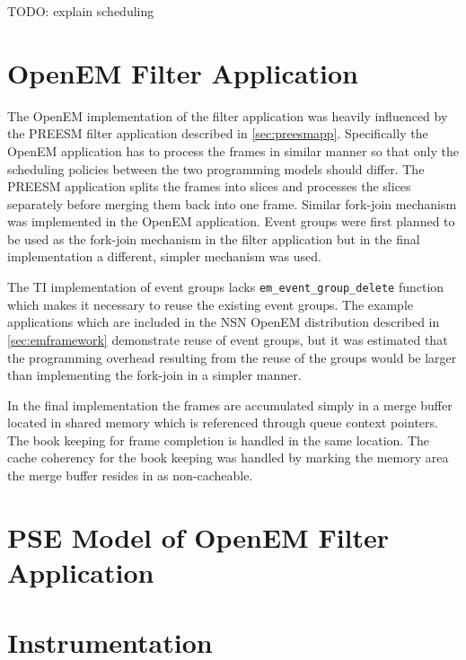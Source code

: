 TODO: explain scheduling

\section{OpenEM Filter Application}
The OpenEM implementation of the filter application was heavily influenced by
the PREESM filter application described in \ref{sec:preesmapp}. Specifically the
OpenEM application has to process the frames in similar manner so that only the
scheduling policies between the two programming models should differ. The PREESM
application splits the frames into slices and processes the slices separately
before merging them back into one frame. Similar fork-join mechanism was
implemented in the OpenEM application. Event groups were first planned to be
used as the fork-join mechanism in the filter application but in the final
implementation a different, simpler mechanism was used.

The TI implementation of event groups lacks \texttt{em\_event\_group\_delete}
function which makes it necessary to reuse the existing event groups. The
example applications which are included in the NSN OpenEM distribution
described in \ref{sec:emframework} demonstrate reuse of event groups, but it
was estimated that the programming overhead resulting from the reuse of the
groups would be larger than implementing the fork-join in a simpler manner.

In the final implementation the frames are accumulated simply in a merge buffer
located in shared memory which is referenced through queue context pointers. The
book keeping for frame completion is handled in the same location. The cache
coherency for the book keeping was handled by marking the memory area the merge
buffer resides in as non-cacheable.

\section{PSE Model of OpenEM Filter Application}
\section{Instrumentation}
